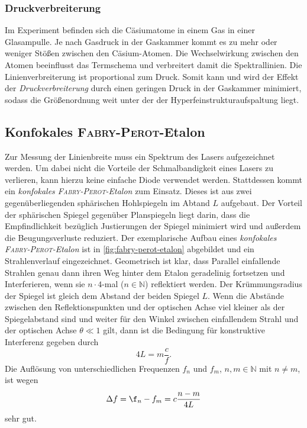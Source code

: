 \documentclass[../bericht.tex]{subfiles}
\begin{document}
      \subsubsection{Druckverbreiterung}
      \label{sssec:druckverbreiterung}

        Im Experiment befinden sich die Cäsiumatome in einem Gas in einer Glasampulle. Je nach Gasdruck in der Gaskammer kommt es zu mehr oder weniger St\"o\ss{}en zwischen den C\"asium-Atomen. Die Wechselwirkung zwischen den Atomen beeinflusst das Termschema und
        verbreitert damit die Spektrallinien. Die Linienverbreiterung ist proportional zum Druck. Somit kann und wird der Effekt der \textit{Druckverbreiterung} durch einen geringen Druck in der Gaskammer minimiert, sodass die Größenordnung weit unter der der Hyperfeinstrukturaufspaltung liegt.


      \subsection{Konfokales \textsc{Fabry-Perot}-Etalon}
      \label{subsec:fabry-perot-etalon}


        Zur Messung der Linienbreite muss ein Spektrum des Lasers aufgezeichnet werden. Um dabei nicht die Vorteile der Schmalbandigkeit eines Lasers zu verlieren, kann hierzu keine einfache Diode verwendet werden. Stattdessen kommt ein \textit{konfokales \textsc{Fabry-Perot}-Etalon} zum Einsatz. Dieses ist aus zwei gegenüberliegenden sphärischen Hohlspiegeln im Abtand $L$ aufgebaut. Der Vorteil der sphärischen Spiegel gegenüber Planspiegeln liegt darin, dass die Empfindlichkeit bezüglich Justierungen der Spiegel minimiert wird und außerdem die Beugungsverluste reduziert. Der exemplarische Aufbau eines \textit{konfokales \textsc{Fabry-Perot}-Etalon} ist in \cref{fig:fabry-perot-etalon} abgebildet und ein Strahlenverlauf eingezeichnet. Geometrisch ist klar, dass Parallel einfallende Strahlen genau dann ihren Weg hinter dem Etalon geradelinig fortsetzen und Interferieren, wenn sie $n\cdot 4$-mal ($n\in\mathbb{N}$) reflektiert werden. Der Krümmungsradius der Spiegel ist gleich dem Abstand der beiden Spiegel $L$. Wenn die Abstände zwischen den Reflektionspunkten und der optischen Achse viel kleiner als der Spiegelabstand sind und weiter für den Winkel zwischen einfallendem Strahl und der optischen Achse $\theta \ll 1$ gilt, dann ist die Bedingung für konstruktive Interferenz gegeben durch
        \begin{equation*}
          4L = m \frac{c}{f}.
        \end{equation*}
        Die Auflösung von unterschiedlichen Frequenzen $f_n$ und $f_m$, $n,m\in\mathbb{N}$ mit $n\ne m $, ist wegen
        \begin{equation*}
          \Delta f= \f_n-f_m=c \frac{n-m}{4L}
        \end{equation*}
        sehr gut.
\end{document}
